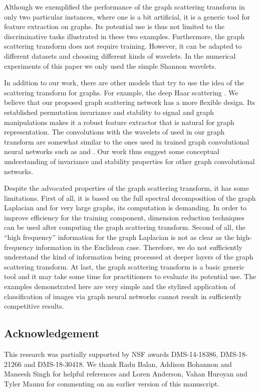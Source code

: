 \documentclass{article}
\begin{document}
{Although we exemplified the performance of the graph scattering transform in only two particular instances, where one is a bit artificial, it is a generic tool for feature extraction on graphs. Its potential use is thus not limited to the discriminative tasks illustrated in these two examples. Furthermore, the graph scattering transform does not require training. However, it can be adapted to different datasets and choosing  different kinds of wavelets. In the numerical experiments of this paper we only used the simple Shannon wavelets.}

{In addition to our work, there are other models that try to use the idea of the scattering transform for graphs. For example, the deep Haar scattering \cite{CheCM14}. We believe that our proposed graph scattering network has a more flexible design. Its established  permutation invariance and stability to signal and graph manipulations makes it a robust feature extractor that is natural for graph representation.
The convolutions with the wavelets of \cite{HamVG11} used in our graph transform are somewhat similar to the ones used in trained graph convolutional neural networks such as \cite{DefBV16} and \cite{KipW16}. Our work thus suggest some conceptual understanding of invariance and stability properties for other graph convolutional networks.}

{Despite the advocated properties of the graph scattering transform, it has some limitations. First of all, it is based on the full spectral decomposition of the graph Laplacian and for very large graphs, its computation is demanding.
In order to improve efficiency for the training component, dimension reduction techniques can be used after computing  the graph scattering transform. Second of all, the ``high frequency'' information for the graph Laplacian is not as clear as the high-frequency information in the Euclidean case. Therefore, we do not sufficiently understand the kind of information being processed at deeper layers of the graph scattering transform. At last, the graph scattering transform is a basic generic tool and it may take some time for practitioners to evaluate its potential use. The examples demonstrated here are very simple and the stylized application of classification of images via graph neural networks cannot result in sufficiently competitive results.}

\subsection*{Acknowledgement}
This research was partially supported by NSF {awards DMS-14-18386, DMS-18-21266 and DMS-18-30418}. We thank Radu Balan, Addison Bohannon and Maneesh Singh for helpful references and Loren Anderson, Vahan Huroyan and Tyler Maunu for commenting on an earlier version of this manuscript.



\end{document}
